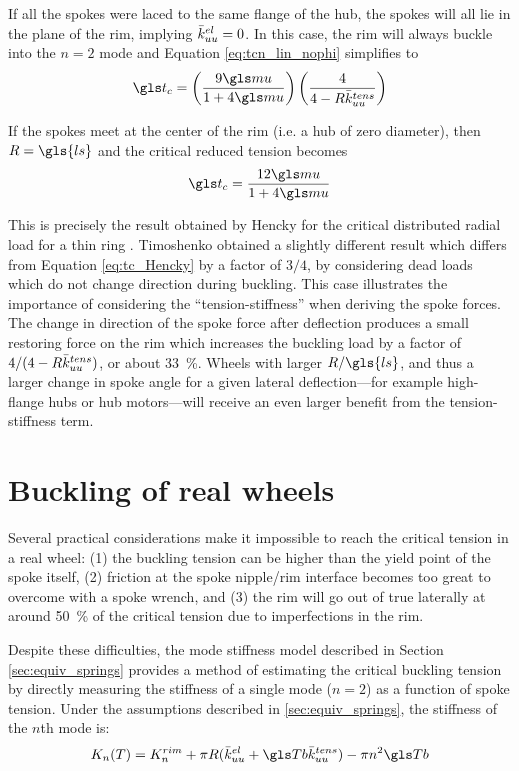 \documentclass[\rootdir/thesis.tex]{subfiles}
\begin{document}
If all the spokes were laced to the same flange of the hub, the spokes will all lie in the plane of the rim, implying $\bar{k}_{uu}^{el}=0$. In this case, the rim will always buckle into the $n=2$ mode and Equation \eqref{eq:tcn_lin_nophi} simplifies to
\begin{equation}
\ts_c = \left(\frac{9\m}{1 + 4\m}\right)\left(\frac{4}{4 - R\kuu^{tens}}\right)
\end{equation}

If the spokes meet at the center of the rim (i.e. a hub of zero diameter), then $R=\gls{ls}$ and the critical reduced tension becomes
\begin{equation}
\label{eq:tc_Hencky}
\ts_c = \frac{12\m}{1 + 4\m}
\end{equation}

This is precisely the result obtained by Hencky for the critical distributed radial load for a thin ring \cite{Timoshenko1961}. Timoshenko obtained a slightly different result which differs from Equation \eqref{eq:tc_Hencky} by a factor of  $3/4$, by considering dead loads which do not change direction during buckling. This case illustrates the importance of considering the ``tension-stiffness'' when deriving the spoke forces. The change in direction of the spoke force after deflection produces a small restoring force on the rim which increases the buckling load by a factor of $4/(4 - R\bar{k}_{uu}^{tens})$, or about \SI{33}{\percent}. Wheels with larger $R/\gls{ls}$, and thus a larger change in spoke angle for a given lateral deflection---for example high-flange hubs or hub motors---will receive an even larger benefit from the tension-stiffness term.

\section{Buckling of real wheels}
\label{sec:K2_tension_buckling}

Several practical considerations make it impossible to reach the critical tension in a real wheel: (1) the buckling tension can be higher than the yield point of the spoke itself, (2) friction at the spoke nipple/rim interface becomes too great to overcome with a spoke wrench, and (3) the rim will go out of true laterally at around \SI{50}{\percent} of the critical tension due to imperfections in the rim.

Despite these difficulties, the mode stiffness model described in Section \ref{sec:equiv_springs} provides a method of estimating the critical buckling tension by directly measuring the stiffness of a single mode ($n=2$) as a function of spoke tension. Under the assumptions described in \ref{sec:equiv_springs}, the stiffness of the $n$th mode is:
\begin{equation}
\label{eq:Kn_buckling}
K_n(T) = K_n^{rim} + \pi R (\bar{k}_{uu}^{el} + \Tb \bar{k}_{uu}^{tens}) - \pi n^2 \Tb
\end{equation}
\end{document}
